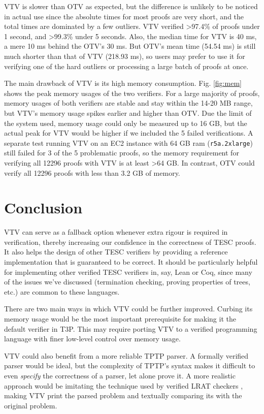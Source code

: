 \documentclass[12pt]{article}
\begin{document}


VTV is slower than OTV as expected, but the difference is unlikely to be noticed 
in actual use since the absolute times for most proofs are very short, and the 
total times are dominated by a few outliers. 
VTV verified >97.4\% of proofs under 1 second, and >99.3\% under 5 seconds. 
Also, the median time for VTV is 40 ms, a mere 10 ms behind the OTV's 30 ms. 
But OTV's mean time (54.54 ms) is still much shorter than that of VTV (218.93 ms),
so users may prefer to use it for verifying one of the hard outliers or processing
a large batch of proofs at once.

The main drawback of VTV is its high memory consumption. Fig. \ref{fig:mem} shows
the peak memory usages of the two verifiers. For a large majority of proofs, 
memory usages of both verifiers are stable and stay within the 14-20 MB range,
but VTV's memory usage spikes earlier and higher than OTV. Due the limit of the system 
used, memory usage could only be measured up to 16 GB, but the actual peak for VTV 
would be higher if we included the 5 failed verifications. A separate test running 
VTV on an EC2 instance with 64 GB ram (\texttt{r5a.2xlarge}) still failed for 3 of 
the 5 problematic proofs, so the memory requirement for verifying all 12296 proofs 
with VTV is at least >64 GB. In contrast, OTV could verify all 
12296 proofs with less than 3.2 GB of memory.



\section{Conclusion}  \label{sec:conclusion}

VTV can serve as a fallback option whenever extra rigour is required in verification, 
thereby increasing our confidence in the correctness of TESC proofs. 
It also helps the design of other TESC verifiers by providing a reference 
implementation that is guaranteed to be correct. It should be particularly helpful 
for implementing other verified TESC verifiers in, say, Lean or Coq, since many 
of the issues we've discussed (termination checking, proving properties of trees, etc.) 
are common to these languages. 

There are two main ways in which VTV could be further improved. Curbing its 
memory usage would be the most important prerequisite for making it the 
default verifier in T3P. This may require porting VTV to a verified programming
language with finer low-level control over memory usage. 

VTV could also benefit from a more reliable TPTP parser. A formally verified 
parser would be ideal, but the complexity of TPTP's syntax makes it difficult  
to even \textit{specify} the correctness of a parser, let alone prove it. 
A more realistic approach would be imitating the technique used by verified 
LRAT checkers \cite{heule2017efficient}, making VTV print the parsed problem 
and textually comparing its with the original problem.




\end{document}
